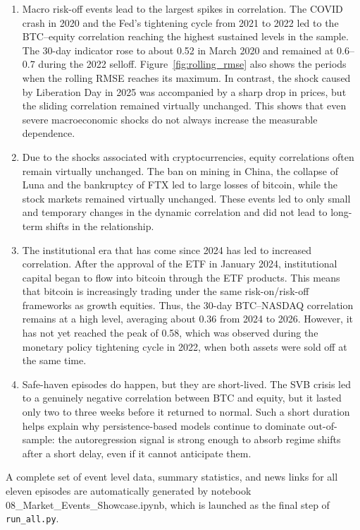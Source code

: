 \begin{enumerate}
    \item Macro risk-off events lead to the largest spikes in correlation. The COVID crash in 2020 and the Fed's tightening cycle from 2021 to 2022 led to the BTC--equity correlation reaching the highest sustained levels in the sample. The 30-day indicator rose to about 0.52 in March 2020 and remained at 0.6--0.7 during the 2022 selloff. Figure~\ref{fig:rolling_rmse} also shows the periods when the rolling RMSE reaches its maximum. In contrast, the shock caused by Liberation Day in 2025 was accompanied by a sharp drop in prices, but the sliding correlation remained virtually unchanged. This shows that even severe macroeconomic shocks do not always increase the measurable dependence.

    \item Due to the shocks associated with cryptocurrencies, equity correlations often remain virtually unchanged. The ban on mining in China, the collapse of Luna and the bankruptcy of FTX led to large losses of bitcoin, while the stock markets remained virtually unchanged. These events led to only small and temporary changes in the dynamic correlation and did not lead to long-term shifts in the relationship.

    \item The institutional era that has come since 2024 has led to increased correlation. After the approval of the ETF in January 2024, institutional capital began to flow into bitcoin through the ETF products. This means that bitcoin is increasingly trading under the same risk-on/risk-off frameworks as growth equities. Thus, the 30-day BTC--NASDAQ correlation remains at a high level, averaging about 0.36 from 2024 to 2026. However, it has not yet reached the peak of 0.58, which was observed during the monetary policy tightening cycle in 2022, when both assets were sold off at the same time.

    \item Safe-haven episodes do happen, but they are short-lived. The SVB crisis led to a genuinely negative correlation between BTC and equity, but it lasted only two to three weeks before it returned to normal. Such a short duration helps explain why persistence-based models continue to dominate out-of-sample: the autoregression signal is strong enough to absorb regime shifts after a short delay, even if it cannot anticipate them.
\end{enumerate}

A complete set of event level data, summary statistics, and news links for all eleven episodes are automatically generated by notebook 08\_Market\_Events\_Showcase.ipynb, which is launched as the final step of \texttt{run\_all.py}.

\clearpage
